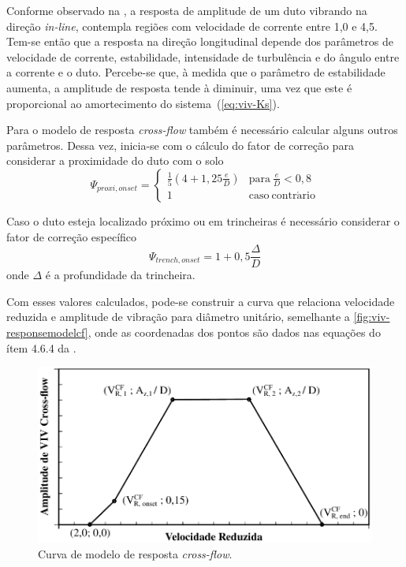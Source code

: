 Conforme observado na , a resposta de amplitude de um duto vibrando na direção \textit{in-line}, contempla regiões com velocidade de corrente entre 1,0 e 4,5.
Tem-se então que a resposta na direção longitudinal depende dos parâmetros de velocidade de corrente, estabilidade, intensidade de turbulência e do ângulo entre a corrente e o duto.
Percebe-se que, à medida que o parâmetro de estabilidade aumenta, a amplitude de resposta tende à diminuir, uma vez que este é proporcional ao amortecimento do sistema~(\autoref{eq:viv-Ks}).

Para o modelo de resposta \textit{cross-flow} também  é necessário calcular alguns outros parâmetros. Dessa vez, inicia-se com o cálculo do fator de correção para considerar a proximidade do duto com o solo
\begin{equation}
\label{eq:viv-Psi}
\Psi_{\mathit{proxi}, \mathit{onset}} =
\begin{cases}
\frac{1}{5}\left(4 + 1,25\frac{e}{D} \right) & \mathrm{para}~\frac{e}{D} < 0,8\\
1                                            & \mathrm{caso~contr\acute{a}rio}
\end{cases}
\end{equation}

Caso o duto esteja localizado próximo ou em trincheiras é necessário considerar o fator de correção específico
\begin{equation}
\label{eq:viv-Psitren}
\Psi_{\mathit{trench}, \mathit{onset}} = 1 + 0,5\frac{\Delta}{D}
\end{equation}
onde $\Delta$ é a profundidade da trincheira.

Com esses valores calculados, pode-se construir a curva que relaciona velocidade reduzida e amplitude de vibração para diâmetro unitário, semelhante a \autoref{fig:viv-responsemodelcf}, onde as coordenadas dos pontos são dados nas equações do ítem 4.6.4 da .

\begin{figure}[!ht]
    \centering
    \caption{Curva de modelo de resposta \textit{cross-flow}.}\label{fig:viv-responsemodelcf}
    \includegraphics[width=0.65\linewidth]{imagens/response_model_CF}
\end{figure}


